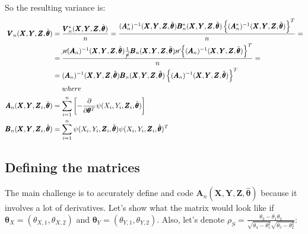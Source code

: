 \documentclass[]{article}
\begin{document}
So the resulting variance is:
	$$
	\begin{aligned}
		\pmb{V}_n(\pmb{X}, \pmb{Y}, \pmb{Z}, \hat{\pmb{\theta}}) &= \frac{\pmb{V}^*_n(\pmb{X}, \pmb{Y}, \pmb{Z}, \hat{\pmb{\theta}})}{n} = \frac{(\pmb{A}_n^*)^{-1}(\pmb{X}, \pmb{Y}, \pmb{Z}, \hat{\pmb{\theta}}) \pmb{B}^*_n(\pmb{X}, \pmb{Y}, \pmb{Z}, \hat{\pmb{\theta}})  \left\{(\pmb{A}_n^*)^{-1}(\pmb{X}, \pmb{Y}, \pmb{Z}, \hat{\pmb{\theta}}) \right\}^T}{n} = \\
    &=\frac{\cancel{n}(\pmb{A}_n)^{-1}(\pmb{X}, \pmb{Y}, \pmb{Z}, \hat{\pmb{\theta}})\frac{1}{\cancel{n}} \pmb{B}_n(\pmb{X}, \pmb{Y}, \pmb{Z}, \hat{\pmb{\theta}})  \cancel{n}\left\{(\pmb{A}_n)^{-1}(\pmb{X}, \pmb{Y}, \pmb{Z}, \hat{\pmb{\theta}}) \right\}^T}{n} = \\
    &=(\pmb{A}_n)^{-1}(\pmb{X}, \pmb{Y}, \pmb{Z}, \hat{\pmb{\theta}}) \pmb{B}_n(\pmb{X}, \pmb{Y}, \pmb{Z}, \hat{\pmb{\theta}})  \left\{(\pmb{A}_n)^{-1}(\pmb{X}, \pmb{Y}, \pmb{Z}, \hat{\pmb{\theta}}) \right\}^T\\
    &~~~~where\\
		\pmb{A}_n(\pmb{X}, \pmb{Y}, \pmb{Z}_i, \hat{\pmb{\theta}}) &=  \sum_{i = 1}^{n}\left[ -\frac{\partial}{\partial \pmb{\theta}^T}\psi(X_i, Y_i, \pmb{Z}_i, \hat{\pmb{\theta}}) \right]\\
		\pmb{B}_n(\pmb{X}, \pmb{Y}, \pmb{Z}_i, \hat{\pmb{\theta}}) &=  \sum_{i = 1}^{n} \psi(X_i, Y_i, \pmb{Z}_i, \hat{\pmb{\theta}}) \psi(X_i, Y_i, \pmb{Z}_i, \hat{\pmb{\theta}})^T\\
 	\end{aligned}
	$$

\subsection{Defining the matrices}
\label{Defining:Matr}

The main challenge is to accurately define and code $\pmb{A}_n(\pmb{X}, \pmb{Y}, \pmb{Z}, \hat{\pmb{\theta}})$ because it involves a lot of derivatives. Let's show what the matrix would look like if $\pmb{\theta}_X = (\theta_{X, 1}, \theta_{X, 2})$ and $\pmb{\theta}_Y= (\theta_{Y, 1}, \theta_{Y, 2})$. Also, let's denote $\rho_S = \frac{\theta_3 - \theta_1\theta_2}{\sqrt{\theta_4 - \theta_1^2}\sqrt{\theta_5 - \theta_2^2}}$:
\end{document}
